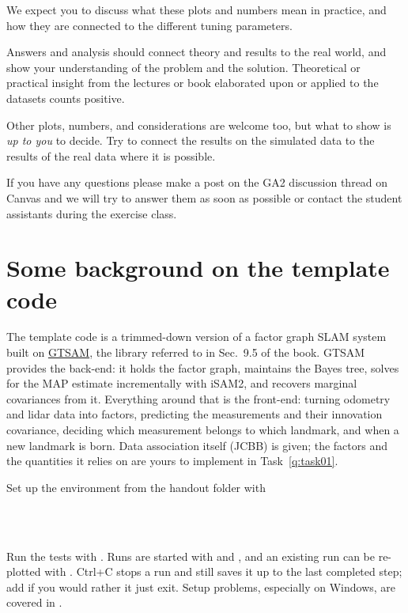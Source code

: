 \documentclass{exam}
\begin{document}
We expect you to discuss what these plots and numbers mean in practice, and how they are connected to the different tuning parameters.

Answers and analysis should connect theory and results to the real world, and show your understanding of the problem and the solution. Theoretical or practical insight from the lectures or book elaborated upon or applied to the datasets counts positive.

Other plots, numbers, and considerations are welcome too, but what to show is \emph{up to you} to decide.
Try to connect the results on the simulated data to the results of the real data where it is possible.

If you have any questions please make a post on the GA2 discussion thread on Canvas and we will try to answer them as soon as possible or contact the student assistants during the exercise class.

\noindent\makebox[\linewidth]{\rule{\textwidth}{0.4pt}}

\section*{Some background on the template code}
The template code is a trimmed-down version of a factor graph SLAM system built on \href{https://gtsam.org}{GTSAM}, the library referred to in Sec.\ 9.5 of the book. GTSAM provides the back-end: it holds the factor graph, maintains the Bayes tree, solves for the MAP estimate incrementally with iSAM2, and recovers marginal covariances from it. Everything around that is the front-end: turning odometry and lidar data into factors, predicting the measurements and their innovation covariance, deciding which measurement belongs to which landmark, and when a new landmark is born. Data association itself (JCBB) is given; the factors and the quantities it relies on are yours to implement in Task~\ref{q:task01}.

Set up the environment from the handout folder with
\begin{center}
     \\
     \\
\end{center}
Run the tests with . Runs are started with  and , and an existing run can be re-plotted with . Ctrl+C stops a run and still saves it up to the last completed step; add  if you would rather it just exit. Setup problems, especially on Windows, are covered in .
\end{document}
